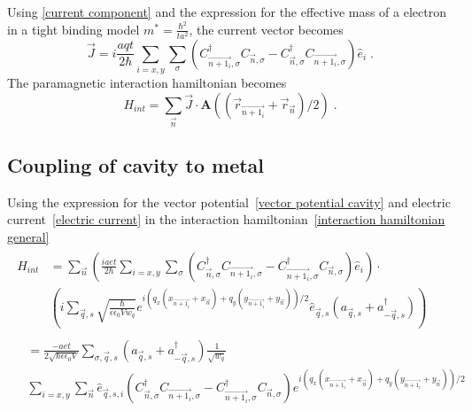 \documentclass{article}
\begin{document}
Using \cref{current component} and the expression for the effective mass of a electron in a tight binding model $m^* = \frac{\hbar^2}{t a^2}$, the current vector becomes
\begin{equation}
    \vec{J} = i\frac{a q t}{2\hbar} \sum_{i=x,y}\sum_{\sigma} \left( C_{\vec{n + 1_i},\sigma}^{\dagger} C_{\vec{n},\sigma} - C_{\vec{n},\sigma}^{\dagger} C_{\vec{n + 1_i},\sigma} \right)\hat{e}_i\;.
    \label{electric current}
\end{equation}
The paramagnetic interaction hamiltonian becomes 
\begin{equation}
    H_{int} = \sum_{\vec{n}} \vec{J} \cdot \textbf{A}((\vec{r}_{\vec{n + 1_i}} + \vec{r}_{\vec{n}})/2 )\;.
    \label{interaction hamiltonian general}
\end{equation}
\subsection{Coupling of cavity to metal}
Using the expression for the vector potential~\cref{vector potential cavity} and electric current~\cref{electric current} in the interaction hamiltonian~\cref{interaction hamiltonian general}
\begin{align*}
    \begin{split}
    H_{int} &= \sum_{\vec{n}} \left(\frac{iaet}{2\hbar} \sum_{i=x,y}\sum_{\sigma} (C_{\vec{n},\sigma}^{\dagger} C_{\vec{n + 1_i},\sigma} - C_{\vec{n + 1_i},\sigma}^{\dagger} C_{\vec{n},\sigma})\hat{e}_i\right) \cdot \\     
            &\left(i \sum_{\vec{q},s} \sqrt{\frac{\hbar}{\epsilon \epsilon_0 V w_q}} e^{i\left(q_x \left(x_{\vec{n + 1_i}} + x_{\vec{n}} \right) + q_y \left(y_{\vec{n + 1_i}} + y_{\vec{n}} \right)\right)/2} \hat{e}_{\vec{q},s}\left(a_{\vec{q},s} + a_{-\vec{q}, s}^{\dagger}\right)\right)
    \end{split}\\
    \begin{split}
            &= \frac{-aet}{2\sqrt{\hbar \epsilon \epsilon_0 V} } \sum_{\sigma,\vec{q},s} \left(a_{\vec{q},s} + a_{-\vec{q}, s}^{\dagger}\right) \frac{1}{\sqrt{w_q}} \\ 
            &  \sum_{i=x,y} \sum_{\vec{n}} \hat{e}_{\vec{q},s,i} (C_{\vec{n},\sigma}^{\dagger} C_{\vec{n + 1_i},\sigma} - C_{\vec{n + 1_i},\sigma}^{\dagger} C_{\vec{n},\sigma}) e^{i\left(q_x \left(x_{\vec{n + 1_i}} + x_{\vec{n}} \right) + q_y \left(y_{\vec{n + 1_i}} + y_{\vec{n}} \right)\right)/2}
    \end{split}
     \label{interaction hamiltonian step 1}\textbf{}
\end{align*}
\end{document}
